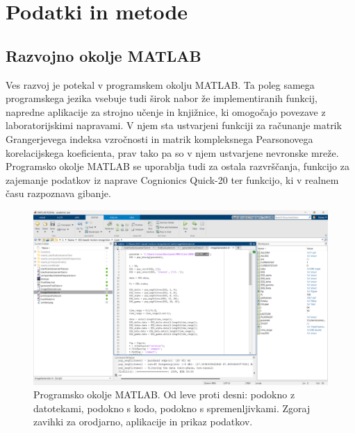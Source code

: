 \chapter{Podatki in metode}
\section{Razvojno okolje MATLAB}
Ves razvoj je potekal v programskem okolju MATLAB. Ta poleg samega programskega jezika vsebuje tudi širok nabor že implementiranih funkcij, napredne aplikacije za strojno učenje in knjižnice, ki omogočajo povezave z laboratorijskimi napravami. V njem sta ustvarjeni funkciji za računanje matrik Grangerjevega indeksa vzročnosti in matrik kompleksnega Pearsonovega korelacijskega koeficienta, prav tako pa so v njem ustvarjene nevronske mreže. Programsko okolje MATLAB se uporablja tudi za ostala razvrščanja, funkcijo za zajemanje podatkov iz naprave Cognionics Quick-20 ter funkcijo, ki v realnem času razpoznava gibanje. \cite{MATLAB}
\begin{figure}[h!]
    \begin{center}
    \includegraphics[width=1\linewidth]{slike/Matlab.png}
    \end{center}
    \caption[Programsko okolje MATLAB.]{Programsko okolje MATLAB. Od leve proti desni: podokno z datotekami, podokno s kodo, podokno s spremenljivkami. Zgoraj zavihki za orodjarno, aplikacije in prikaz podatkov.}
    \end{figure}
    
